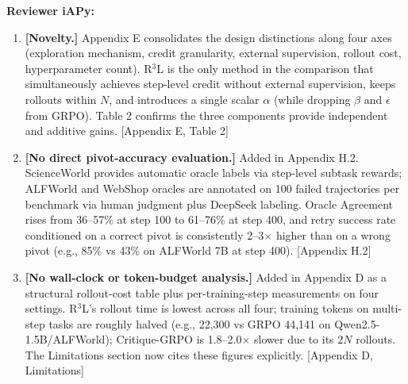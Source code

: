 \documentclass[11pt]{article}
\begin{document}
\noindent \textbf{Reviewer iAPy:}
\begin{enumerate}[label=(\arabic*), itemsep=2pt]
    \item \textbf{[Novelty.]} Appendix E consolidates the design distinctions along four axes (exploration mechanism, credit granularity, external supervision, rollout cost, hyperparameter count). R$^3$L is the only method in the comparison that simultaneously achieves step-level credit without external supervision, keeps rollouts within $N$, and introduces a single scalar $\alpha$ (while dropping $\beta$ and $\epsilon$ from GRPO). Table 2 confirms the three components provide independent and additive gains. [Appendix E, Table 2]

    \item \textbf{[No direct pivot-accuracy evaluation.]} Added in Appendix H.2. ScienceWorld provides automatic oracle labels via step-level subtask rewards; ALFWorld and WebShop oracles are annotated on 100 failed trajectories per benchmark via human judgment plus DeepSeek labeling. Oracle Agreement rises from 36--57\% at step 100 to 61--76\% at step 400, and retry success rate conditioned on a correct pivot is consistently 2--3$\times$ higher than on a wrong pivot (e.g., 85\% vs 43\% on ALFWorld 7B at step 400). [Appendix H.2]

    \item \textbf{[No wall-clock or token-budget analysis.]} Added in Appendix D as a structural rollout-cost table plus per-training-step measurements on four settings. R$^3$L's rollout time is lowest across all four; training tokens on multi-step tasks are roughly halved (e.g., 22{,}300 vs GRPO 44{,}141 on Qwen2.5-1.5B/ALFWorld); Critique-GRPO is 1.8--2.0$\times$ slower due to its $2N$ rollouts. The Limitations section now cites these figures explicitly. [Appendix D, Limitations]
\end{enumerate}
\end{document}
